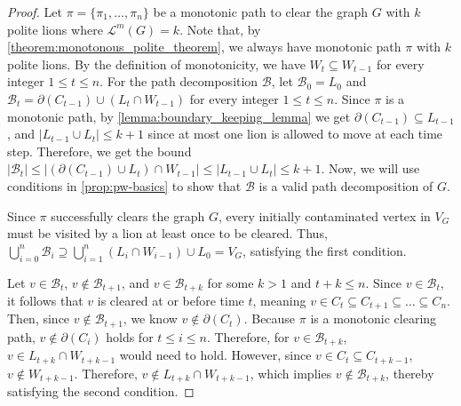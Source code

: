 \documentclass[a4paper,UKenglish,cleveref, autoref, thm-restate]{lipics-v2021}
\begin{document}
\begin{proof}
Let $\pi=\{\pi_1, \dots, \pi_n\}$ be a monotonic path to clear the graph $G$ with $k$ polite lions where $\mathcal{L}^m(G)=k$. Note that, by \cref{theorem:monotonous_polite_theorem}, we always have monotonic path $\pi$ with $k$ polite lions. By the definition of monotonicity, we have $W_{t} \subseteq W_{t-1}$ for every integer $1 \leq t \leq n$.
For the path decomposition $\mathcal{B}$, let $\mathcal{B}_0 = L_0$ and $\mathcal{B}_t = \partial(C_{t-1}) \cup (L_t \cap W_{t-1})$ for every integer $1 \leq t \leq n$.
Since $\pi$ is a monotonic path, by \cref{lemma:boundary_keeping_lemma} we get $\partial(C_{t-1}) \subseteq L_{t-1}$, and $|L_{t-1}\cup L_t|\leq k+1$ since at most one lion is allowed to move at each time step. Therefore, we get the bound $|\mathcal{B}_t| \leq |(\partial(C_{t-1})\cup L_t) \cap W_{t-1}| \leq |L_{t-1}\cup L_t| \leq k+1$.
Now, we will use conditions in \cref{prop:pw-basics} to show that $\mathcal{B}$ is a valid path decomposition of $G$.

 Since $\pi$ successfully clears the graph $G$, every initially contaminated vertex in $V_G$ must be visited by a lion at least once to be cleared. Thus, $\bigcup_{i=0}^n \mathcal{B}_i \supseteq \bigcup_{i=1}^n (L_i \cap W_{i-1}) \cup L_0 = V_G$, satisfying the first condition.

 Let $v \in \mathcal{B}_t$, $v \notin \mathcal{B}_{t+1}$, and $v\in \mathcal{B}_{t+k}$ for some $k>1$ and $t+k\leq n$. Since $v \in \mathcal{B}_t$, it follows that $v$ is cleared at or before time $t$, meaning $v \in C_t \subseteq C_{t+1} \subseteq \dots \subseteq C_n$. Then, since $v \notin \mathcal{B}_{t+1}$, we know $v \notin \partial(C_t)$. Because $\pi$ is a monotonic clearing path, $v \notin \partial(C_i)$ holds for $t\leq i\leq n$. Therefore, for $v\in \mathcal{B}_{t+k}$, $v \in L_{t+k} \cap W_{t+k-1}$ would need to hold. However, since $v \in C_t \subseteq C_{t+k-1}$, $v \notin W_{t+k-1}$. Therefore, $v\notin L_{t+k} \cap W_{t+k-1}$, which implies $v\notin \mathcal{B}_{t+k}$, thereby satisfying the second condition.


\end{proof}
\end{document}
